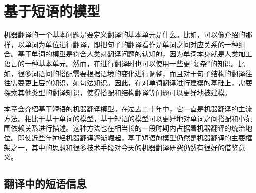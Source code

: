 
%


\renewcommand\figurename{图}%
\renewcommand\tablename{表}%


\chapter{基于短语的模型}

\parinterval 机器翻译的一个基本问题是要定义翻译的基本单元是什么。比如，可以像{\chapterfive}介绍的那样，以单词为单位进行翻译，即把句子的翻译看作是单词之间对应关系的一种组合。基于单词的模型是符合人类对翻译问题的认知的，因为单词本身就是人类加工语言的一种基本单元。然而，在进行翻译时也可以使用一些更“复杂”的知识。比如，很多词语间的搭配需要根据语境的变化进行调整，而且对于句子结构的翻译往往需要更上层的知识，如句法知识。因此，在对单词翻译进行建模的基础上，需要探索其他类型的翻译知识，使得搭配和结构翻译等问题可以更好地被建模。

\parinterval 本章会介绍基于短语的机器翻译模型。在过去二十年中，它一直是机器翻译的主流方法。相比于基于单词的模型，基于短语的模型可以更好地对单词之间搭配和小范围依赖关系进行描述。这种方法也在相当长的一段时期内占据着机器翻译的统治地位。即使近些年神经机器翻译逐渐崛起，基于短语的模型仍然是机器翻译的主要框架之一，其中的思想和很多技术手段对今天的机器翻译研究仍然有很好的借鉴意义。

\sectionnewpage
\section{翻译中的短语信息}

